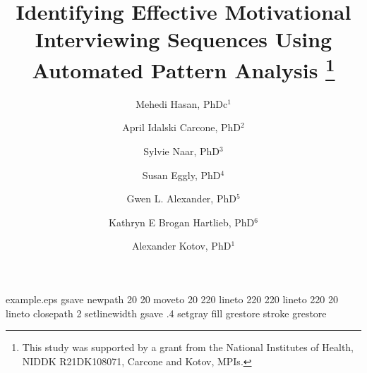 %
%
%
%
%
\begin{filecontents*}{example.eps}
gsave
newpath
  20 20 moveto
  20 220 lineto
  220 220 lineto
  220 20 lineto
closepath
2 setlinewidth
gsave
  .4 setgray fill
grestore
stroke
grestore
\end{filecontents*}
%
\RequirePackage{fix-cm}
%
\documentclass[smallextended]{svjour3}       %
%
\smartqed  %
%
\usepackage{graphicx}
\usepackage[numbers]{natbib}
\usepackage{geometry}
\usepackage{pdflscape}
%
\usepackage{mathptmx}      %
%
%
%
%


\title{Identifying Effective Motivational Interviewing Sequences Using Automated Pattern Analysis
\thanks{This study was supported by a grant from the National Institutes of Health, NIDDK R21DK108071, Carcone and Kotov, MPIs.}
}


\author{Mehedi Hasan, PhDc$^1$\and 
April Idalski Carcone, PhD$^2$\and 
Sylvie Naar, PhD$^3$\and 
Susan Eggly, PhD$^4$\and  
Gwen L. Alexander, PhD$^5$\and 
Kathryn E Brogan Hartlieb, PhD$^6$\and 
Alexander Kotov, PhD$^1$
}

